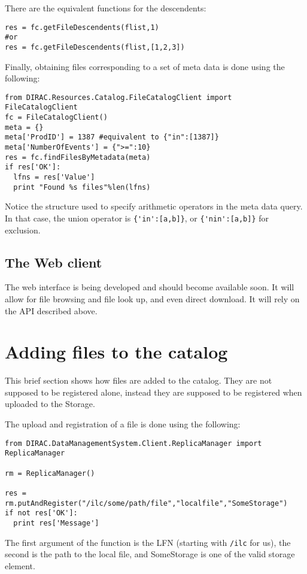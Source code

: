 \documentclass[11pt,a4paper]{scrartcl}
\begin{document}
There are the equivalent functions for the descendents:
\begin{lstlisting}
res = fc.getFileDescendents(flist,1)
#or
res = fc.getFileDescendents(flist,[1,2,3])
\end{lstlisting}

Finally, obtaining files corresponding to a set of meta data is done using the
following:
\begin{lstlisting}
from DIRAC.Resources.Catalog.FileCatalogClient import FileCatalogClient
fc = FileCatalogClient()
meta = {}
meta['ProdID'] = 1387 #equivalent to {"in":[1387]}
meta['NumberOfEvents'] = {">=":10}
res = fc.findFilesByMetadata(meta)
if res['OK']:
  lfns = res['Value']
  print "Found %s files"%len(lfns)
\end{lstlisting}
Notice the structure used to specify arithmetic operators in the meta data
query. In that case, the union operator is \lstinline|{'in':[a,b]}|, or
\lstinline|{'nin':[a,b]}| for exclusion.

\subsection{The Web client}
The web interface is being developed and should become available soon. It will
allow for file browsing and file look up, and even direct download. It will rely
on the API described above.

\section{Adding files to the catalog}\label{sec:addingfiles}
This brief section shows how files are added to the catalog. They are not
supposed to be registered alone, instead they are supposed to be registered when
uploaded to the Storage.

The upload and registration of a file is done using the following:
\begin{lstlisting}
from DIRAC.DataManagementSystem.Client.ReplicaManager import ReplicaManager

rm = ReplicaManager()

res = rm.putAndRegister("/ilc/some/path/file","localfile","SomeStorage")
if not res['OK']:
  print res['Message']
\end{lstlisting}
The first argument of the function is the LFN (starting with \lstinline|/ilc|
for us), the second is the path to the local file, and SomeStorage is one of the valid
storage element. 

~\\
\end{document}
